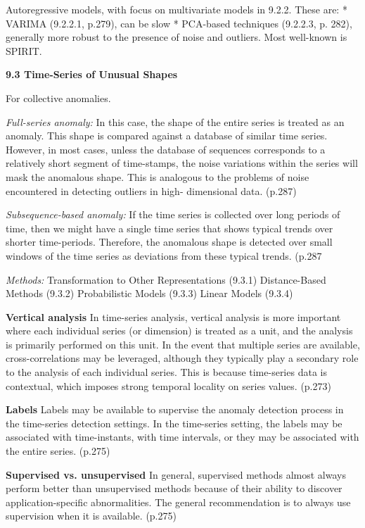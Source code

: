 Autoregressive models, with focus on multivariate models in 9.2.2. These are: \newline
* VARIMA (9.2.2.1, p.279), can be slow \newline
* PCA-based techniques (9.2.2.3, p. 282), generally more robust to the presence of noise and outliers. Most well-known is SPIRIT.

\textbf{9.3 Time-Series of Unusual Shapes}

For collective anomalies.

\textit{Full-series anomaly:} In this case, the shape of the entire series is treated as an anomaly. This shape is compared against a database of similar time series. However, in most cases, unless the database of sequences corresponds to a relatively short segment of time-stamps, the noise variations within the series will mask the anomalous shape. This is analogous to the problems of noise encountered in detecting outliers in high- dimensional data. (p.287)

\textit{Subsequence-based anomaly:} If the time series is collected over long periods of time, then we might have a single time series that shows typical trends over shorter time-periods. Therefore, the anomalous shape is detected over small windows of the time series as deviations from these typical trends. (p.287

\textit{Methods: }
Transformation to Other Representations (9.3.1)
Distance-Based Methods (9.3.2)
Probabilistic Models (9.3.3)
Linear Models (9.3.4)



\textbf{Vertical analysis}
In time-series analysis, vertical analysis is more important where each individual series (or dimension) is treated as a unit, and the analysis is primarily performed on this unit. In the event that multiple series are available, cross-correlations may be leveraged, although they typically play a secondary role to the analysis of each individual series. This is because time-series data is contextual, which imposes strong temporal locality on series values.  (p.273)

\textbf{Labels}
Labels may be available to supervise the anomaly detection process in the time-series detection settings. In the time-series setting, the labels may be associated with time-instants, with time intervals, or they may be associated with the entire series. (p.275)

\textbf{Supervised vs. unsupervised} 
In general, supervised methods almost always perform better than unsupervised methods because of their ability to discover application-specific abnormalities. The general recommendation is to always use supervision when it is available. (p.275)

